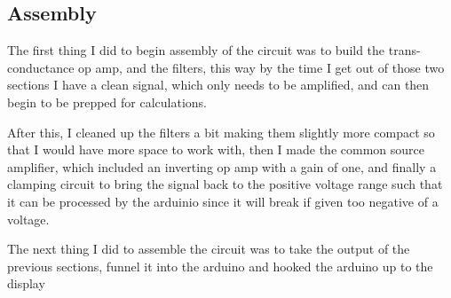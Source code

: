 \documentclass{article}
\begin{document}
\subsection{Assembly}
The first thing I did to begin assembly of the circuit was to build the trans-conductance op amp, and the filters, this way by the time I get out of those two sections I have a clean signal, which only needs to be amplified, and can then begin to be prepped for calculations.
\begin{center}
\end{center}
After this, I cleaned up the filters a bit making them slightly more compact so that I would have more space to work with, then I made the common source amplifier, which included an inverting op amp with a gain of one, and finally a clamping circuit to bring the signal back to the positive voltage range such that it can be processed by the arduinio since it will break if given too negative of a voltage.
\begin{center}
\end{center}
The next thing I did to assemble the circuit was to take the output of the previous sections, funnel it into the arduino and hooked the arduino up to the display
\begin{center}
\end{center}
\end{document}
